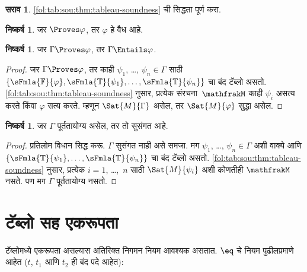 \documentclass[11pt,a4paper,openany]{book}
\theoremstyle{definition}
\newtheorem{prob}{सराव}[chapter]
\newtheorem{cor}[defn]{निष्कर्ष}
\newcommand{\applytofirst}[2]{{\expandafter#1#2}}
\newcommand{\Struct}[1]{\applytofirst{\mathfrak}{#1}}
\newcommand{\True}{\ensuremath{\mathbb{T}}}
\newcommand{\False}{\ensuremath{\mathbb{F}}}
\begin{document}
\begin{prob}
\ref{fol:tab:sou:thm:tableau-soundness} ची सिद्धता पूर्ण करा.
\end{prob}




\begin{cor}
\label{fol:tab:sou:cor:weak-soundness}
जर $\Proves \varphi$, तर $\varphi$ हे वैध आहे.
\end{cor}

\begin{cor}
\label{fol:tab:sou:cor:entailment-soundness}
जर $\Gamma \Proves \varphi$, तर $\Gamma \Entails \varphi$.
\end{cor}

\begin{proof}
  जर $\Gamma \Proves \varphi$, तर काही $\psi_1$, \dots, $\psi_n \in
  \Gamma$ साठी $\{\sFmla{\False}{\varphi}, \sFmla{\True}{\psi_1}, \dots,
  \sFmla{\True}{\psi_n}\}$ चा बंद टॅब्लो असतो.
  \ref{fol:tab:sou:thm:tableau-soundness} नुसार, प्रत्येक
  संरचना~$\Struct{M}$
  काही $\psi_i$ असत्य करते किंवा $\varphi$ सत्य करते. म्हणून
  $\Sat{M}{\Gamma}$ असेल, तर
  $\Sat{M}{\varphi}$ सुद्धा असेल.
\end{proof}

\begin{cor}
\label{fol:tab:sou:cor:consistency-soundness}
जर $\Gamma$ पूर्ततायोग्य असेल, तर तो सुसंगत आहे.
\end{cor}

\begin{proof}
प्रतिलोम विधान सिद्ध करू. $\Gamma$ सुसंगत नाही असे समजा. मग
$\psi_1$, \dots, $\psi_n \in \Gamma$ अशी वाक्ये आणि
$\{\sFmla{\True}{\psi_1}, \dots, \sFmla{\True}{\psi_n}\}$ चा बंद
टॅब्लो असतो. \ref{fol:tab:sou:thm:tableau-soundness} नुसार, प्रत्येक
$i=1$, \dots,~$n$ साठी $\Sat{M}{\psi_i}$ अशी
कोणतीही $\Struct{M}$ नसते. पण मग $\Gamma$
पूर्ततायोग्य नसतो.
\end{proof}












\section{टॅब्लो सह एकरूपता}\label{fol:tab:ide:sec}

टॅब्लोमध्ये एकरूपता असल्यास अतिरिक्त निगमन नियम आवश्यक असतात.
$\eq$ चे नियम पुढीलप्रमाणे आहेत ($t$, $t_1$ आणि $t_2$ ही बंद पदे आहेत):
\end{document}
